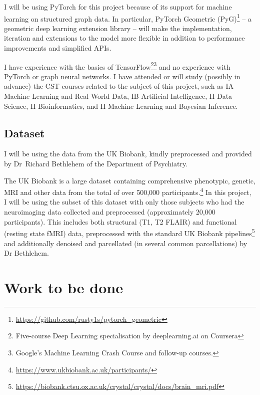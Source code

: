 \documentclass[12pt,a4paper,twoside]{article}
\begin{document}
I will be using PyTorch for this project because of its support for machine learning on structured graph data. In particular, PyTorch Geometric (PyG)\footnote{\url{https://github.com/rusty1s/pytorch_geometric}} – a geometric deep learning extension library – will make the implementation, iteration and extensions to the model more flexible in addition to performance improvements and simplified APIs.

I have experience with the basics of TensorFlow\footnote{Five-course Deep Learning specialisation by deeplearning.ai on Coursera}\footnote{Google's Machine Learning Crash Course and follow-up courses.} and no experience with PyTorch or graph neural networks. I have attended or will study (possibly in advance) the CST courses related to the subject of this project, such as IA Machine Learning and Real-World Data, IB Artificial Intelligence, II Data Science, II Bioinformatics, and II Machine Learning and Bayesian Inference.

\subsection*{Dataset}

I will be using the data from the UK Biobank, kindly preprocessed and provided by Dr~Richard Bethlehem of the Department of Psychiatry.

The UK Biobank is a large dataset containing comprehensive phenotypic, genetic, MRI and other data from the total of over 500,000 participants.\footnote{\url{https://www.ukbiobank.ac.uk/participants/}} In this project, I will be using the subset of this dataset with only those subjects who had the neuroimaging data collected and preprocessed (approximately 20,000 participants). This includes both structural (T1, T2 FLAIR) and functional (resting state fMRI) data, preprocessed with the standard UK Biobank pipelines\footnote{\url{https://biobank.ctsu.ox.ac.uk/crystal/crystal/docs/brain_mri.pdf}} and additionally denoised and parcellated (in several common parcellations) by Dr Bethlehem. 
\newpage
\section*{Work to be done}
\label{section:work}
\end{document}
